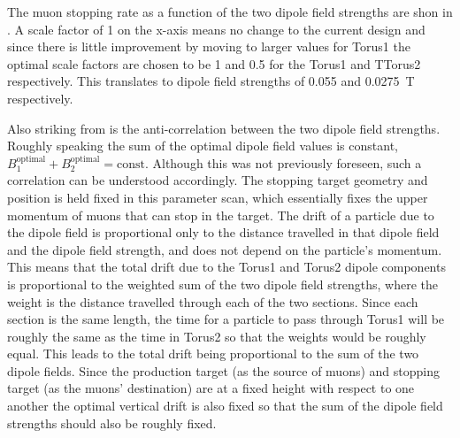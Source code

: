 \FigOptimMuBeamDipoleMuStops
\FigOptimMuBeamDipolePiStops

The muon stopping rate as a function of the two dipole field strengths are shon in .
A scale factor of 1 on the x-axis means no change to the current \phaseI design and since there is little improvement by moving to larger values for Torus1 the optimal scale factors are chosen to be 1 and 0.5 for the Torus1 and TTorus2 respectively.  
This translates to dipole field strengths of 0.055 and 0.0275~T respectively.

Also striking from  is the anti-correlation between the two dipole field strengths.  
Roughly speaking the sum of the optimal dipole field values is constant, \ie $B_1^\text{optimal} + B_2^\text{optimal} = \text{const}$.
Although this was not previously foreseen, such a correlation can be understood accordingly.
The stopping target geometry and position is held fixed in this parameter scan, which essentially fixes the upper momentum of muons that can stop in the target.
The drift of a particle due to the dipole field is proportional only to the distance travelled in that dipole field and the dipole field strength, and does not depend on the particle's momentum.
This means that the total drift due to the Torus1 and Torus2 dipole components is proportional to the weighted sum of the two dipole field strengths, where the weight is the distance travelled through each of the two sections.
Since each section is the same length, the time for a particle to pass through Torus1 will be roughly the same as the time in Torus2 so that the weights would be roughly equal.
This leads to the total drift being proportional to the sum of the two dipole fields.
Since the production target (as the source of muons) and stopping target (as the muons' destination) are at a fixed height with respect to one another the optimal vertical drift is also fixed so that the sum of the dipole field strengths should also be roughly fixed.

\FigOptimMuBeamDipoleMuDispersion

